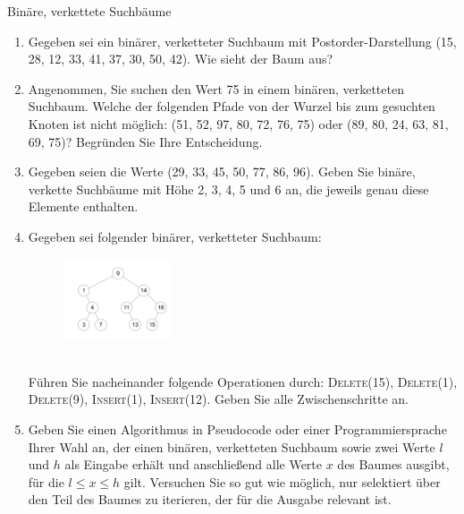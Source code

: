\documentclass[11pt,a4paper]{article}
\begin{document}
\begin{aufgabe}{2}{Binäre, verkettete Suchbäume}
    \begin{enumerate}[label=\alph*)]
        \item Gegeben sei ein binärer, verketteter Suchbaum mit Postorder-Darstellung (15, 28, 12, 33, 41, 37, 30, 50, 42).
        Wie sieht der Baum aus?
        \item Angenommen, Sie suchen den Wert 75 in einem binären, verketteten Suchbaum.
        Welche der folgenden Pfade von der Wurzel bis zum gesuchten Knoten ist nicht möglich: (51, 52, 97, 80, 72, 76, 75) oder (89, 80, 24, 63, 81, 69, 75)?
        Begründen Sie Ihre Entscheidung.
        \item Gegeben seien die Werte (29, 33, 45, 50, 77, 86, 96).
        Geben Sie binäre, verkette Suchbäume mit Höhe 2, 3, 4, 5 und 6 an, die jeweils genau diese Elemente enthalten.
        \item\label{insert_delete} Gegeben sei folgender binärer, verketteter Suchbaum:
        \begin{figure}[h!]
            \centering
            \includegraphics[width=0.3\textwidth]{img/2d}
        \end{figure}
        \FloatBarrier
        \ \\
        Führen Sie nacheinander folgende Operationen durch: \textsc{Delete(15), Delete(1), Delete(9), Insert(1), Insert(12)}.
        Geben Sie alle Zwischenschritte an.
        \item 
        Geben Sie einen Algorithmus in Pseudocode oder einer Programmiersprache Ihrer Wahl an, der einen binären, verketteten Suchbaum sowie zwei Werte $l$ und $h$ als Eingabe erhält und anschließend alle Werte $x$ des Baumes ausgibt, für die $l \leq x \leq h$ gilt.
        Versuchen Sie so gut wie möglich, nur selektiert über den Teil des Baumes zu iterieren, der für die Ausgabe relevant ist.
    \end{enumerate}
\end{aufgabe}
\end{document}
